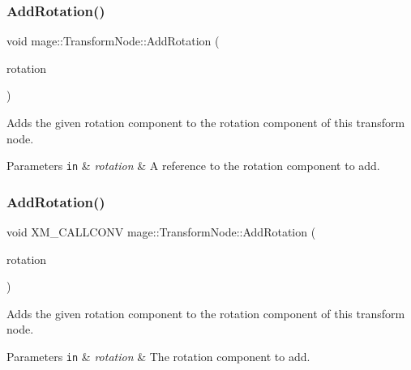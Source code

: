 \subsubsection{\texorpdfstring{Add\+Rotation()}{AddRotation()}\hspace{0.1cm}{\footnotesize\ttfamily [2/3]}}
{\footnotesize\ttfamily void mage\+::\+Transform\+Node\+::\+Add\+Rotation (\begin{DoxyParamCaption}\item[{const X\+M\+F\+L\+O\+A\+T3 \&}]{rotation }\end{DoxyParamCaption})\hspace{0.3cm}{\ttfamily [noexcept]}}

Adds the given rotation component to the rotation component of this transform node.


\begin{DoxyParams}[1]{Parameters}
\mbox{\tt in}  & {\em rotation} & A reference to the rotation component to add. \\
\hline
\end{DoxyParams}
\hypertarget{structmage_1_1_transform_node_af0bc80ccd27d20204e73496cdb68e14b}{}\label{structmage_1_1_transform_node_af0bc80ccd27d20204e73496cdb68e14b} 
\subsubsection{\texorpdfstring{Add\+Rotation()}{AddRotation()}\hspace{0.1cm}{\footnotesize\ttfamily [3/3]}}
{\footnotesize\ttfamily void X\+M\+\_\+\+C\+A\+L\+L\+C\+O\+NV mage\+::\+Transform\+Node\+::\+Add\+Rotation (\begin{DoxyParamCaption}\item[{F\+X\+M\+V\+E\+C\+T\+OR}]{rotation }\end{DoxyParamCaption})\hspace{0.3cm}{\ttfamily [noexcept]}}

Adds the given rotation component to the rotation component of this transform node.


\begin{DoxyParams}[1]{Parameters}
\mbox{\tt in}  & {\em rotation} & The rotation component to add. \\
\hline
\end{DoxyParams}
\hypertarget{structmage_1_1_transform_node_a3914a0f0cfd6b2fdb64c087469a96188}{}\label{structmage_1_1_transform_node_a3914a0f0cfd6b2fdb64c087469a96188} 
